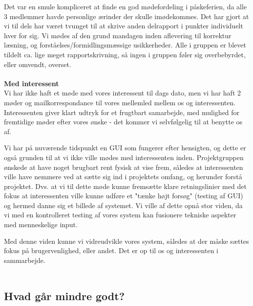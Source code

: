 \documentclass[a4paper,12pt]{article}
\begin{document}
Det var en smule kompliceret at finde en god mødefordeling i påskeferien, da alle 3 medlemmer havde personlige ærinder der skulle imødekommes. Det har gjort at vi til dels har været tvunget til at skrive anden delrapport i punkter individuelt hver for sig. Vi mødes af den grund mandagen inden aflevering til korrektur læsning, og forståelses/formidlingsmæssige usikkerheder. Alle i gruppen er blevet tildelt ca. lige meget rapportskrivning, så ingen i gruppen føler sig overbebyrdet, eller omvendt, overset. 
\\
\\
\textbf{Med interessent}
\\
Vi har ikke haft et møde med vores interessent til dags dato, men vi har haft 2 møder og mailkorrespondance til vores mellemled mellem os og interessenten. Interessenten giver klart udtryk for et frugtbart samarbejde, med mulighed for fremtidige møder efter vores ønske - det kommer vi selvfølgelig til at benytte os 
af.

Vi har på nuværende tidspunkt en GUI som fungerer efter hensigten, og dette er også grunden til at vi ikke ville mødes med interessenten inden. Projektgruppen ønskede at have noget brugbart rent fysisk at vise frem, således at interessenten ville have nemmere ved at sætte sig ind i projektets omfang, og herunder forstå projektet. Dvs. at vi til dette møde kunne fremsætte klare retningslinier med det fokus at interessenten ville kunne udføre et "tænke højt forsøg" (testing af GUI) og hermed danne sig et billede af systemet. Vi ville af dette opnå stor viden, da vi med en kontrolleret testing af vores system kan fusionere tekniske aspekter med menneskelige input.

Med denne viden kunne vi vidreudvikle vores system, således at der måske sættes fokus på brugervenlighed, eller andet. Det er op til os og interessenten i sammarbejde.
\\
\\
\subsection{Hvad går mindre godt?}
\end{document}
